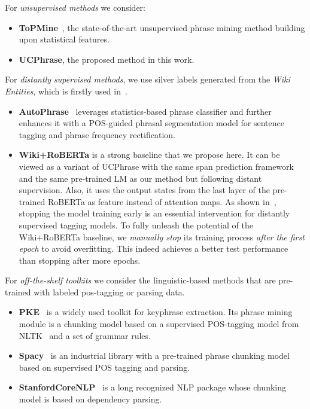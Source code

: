 \documentclass[sigconf]{acmart}
\newcommand{\our}{\mbox{UCPhrase}\xspace}
\begin{document}
\smallskip
\noindent For \emph{{unsupervised methods}} we consider:
\begin{itemize}[leftmargin=*,nosep]
\item \textbf{ToPMine}~\cite{el2014scalable}, the state-of-the-art unsupervised phrase mining method building upon statistical features.
\item \textbf{\our}, the proposed method in this work.
\end{itemize}

\smallskip
\noindent For \emph{distantly supervised methods}, we use silver labels generated from the \emph{Wiki Entities}, which is firstly used in~\cite{shang2018automated}.
\begin{itemize}[leftmargin=*,nosep]
    \item \textbf{AutoPhrase}~\cite{shang2018automated} leverages statistics-based phrase classifier and further enhances it with a POS-guided phrasal segmentation model for sentence tagging and phrase frequency rectification.
    \item \textbf{Wiki+RoBERTa} is a strong baseline that we propose here. 
    It can be viewed as a variant of \our with the same span prediction framework and the same pre-trained LM as our method but following distant supervision.
    Also, it uses the output states from the last layer of the pre-trained RoBERTa as feature instead of attention maps.
    As shown in~\cite{liang2020bond}, stopping the model training early is an essential intervention for distantly supervised tagging models.
    To fully unleash the potential of the Wiki+RoBERTa baseline, we \emph{manually stop} its training process \emph{after the first epoch} to avoid overfitting.
    This indeed achieves a better test performance than stopping after more epochs. 
\end{itemize}

\smallskip
\noindent For \emph{off-the-shelf toolkits} we consider the linguistic-based methods that are pre-trained with labeled pos-tagging or parsing data.
\begin{itemize}[leftmargin=*]
    \item \textbf{PKE}~\cite{boudin2016pke} is a widely used toolkit for keyphrase extraction. Its phrase mining module is a chunking model based on a supervised POS-tagging model from NLTK~\cite{bird2006nltk} and a set of grammar rules.
\item \textbf{Spacy}~\cite{spacy} is an industrial library with a pre-trained phrase chunking model based on supervised POS tagging and parsing.
\item \textbf{StanfordCoreNLP}~\cite{manning2014stanford} is a long recognized NLP package whose chunking model is based on dependency parsing.
\end{itemize}
\end{document}
